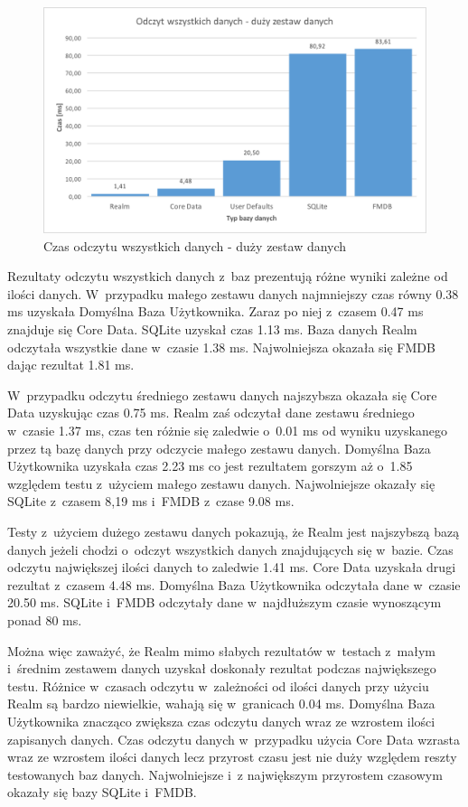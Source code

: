 \newpage

\begin{figure}[h]
\centering
	\includegraphics[width=15cm]{img/read_data/read_all/read_all_test_big.png}
	\caption{Czas odczytu wszystkich danych - duży zestaw danych}
	\label{fig: read-data-big}
\end{figure}

Rezultaty odczytu wszystkich danych z~baz prezentują różne wyniki zależne od ilości danych. W~przypadku małego zestawu danych najmniejszy czas równy 0.38 ms uzyskała Domyślna Baza Użytkownika. Zaraz po niej z~czasem 0.47 ms znajduje się Core Data. SQLite uzyskał czas 1.13 ms. Baza danych Realm odczytała wszystkie dane w~czasie 1.38 ms. Najwolniejsza okazała się FMDB dając rezultat 1.81 ms. 

 W~przypadku odczytu średniego zestawu danych najszybsza okazała się Core Data uzyskując czas 0.75 ms. Realm zaś odczytał dane zestawu średniego w~czasie 1.37 ms, czas ten różnie się zaledwie o~0.01 ms od wyniku uzyskanego przez tą bazę danych przy odczycie małego zestawu danych. Domyślna Baza Użytkownika uzyskała czas 2.23 ms co jest rezultatem gorszym aż o~1.85 względem testu z~użyciem małego zestawu danych. Najwolniejsze okazały się SQLite z~czasem 8,19 ms i~FMDB z~czase 9.08 ms. 

Testy z~użyciem dużego zestawu danych pokazują, że Realm jest najszybszą bazą danych jeżeli chodzi o~odczyt wszystkich danych znajdujących się w~bazie. Czas odczytu największej ilości danych to zaledwie 1.41 ms. Core Data uzyskała drugi rezultat z~czasem 4.48 ms. Domyślna Baza Użytkownika odczytała dane w~czasie 20.50 ms. SQLite i~FMDB odczytały dane w~najdłuższym czasie wynoszącym ponad 80 ms. 

Można więc zaważyć, że Realm mimo słabych rezultatów w~testach z~małym i~średnim zestawem danych uzyskał doskonały rezultat podczas największego testu. Różnice w~czasach odczytu w~zależności od ilości danych przy użyciu Realm są bardzo niewielkie, wahają się w~granicach 0.04 ms. Domyślna Baza Użytkownika znacząco zwiększa czas odczytu danych wraz ze wzrostem ilości zapisanych danych. Czas odczytu danych w~przypadku użycia Core Data wzrasta wraz ze wzrostem ilości danych lecz przyrost czasu jest nie  duży względem reszty testowanych baz danych. Najwolniejsze i~z największym przyrostem czasowym okazały się bazy SQLite i~FMDB. 

